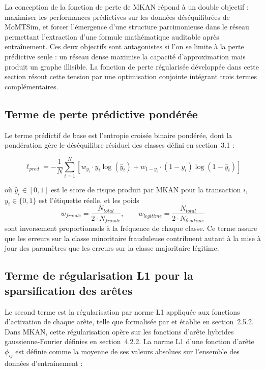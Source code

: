 \documentclass[11pt,a4paper,oneside]{report}
\theoremstyle{definition}
\theoremstyle{remark}
\begin{document}
La conception de la fonction de perte de MKAN répond à un double objectif : maximiser les performances prédictives sur les données déséquilibrées de MoMTSim, et forcer l'émergence d'une structure parcimonieuse dans le réseau permettant l'extraction d'une formule mathématique auditable après entraînement. Ces deux objectifs sont antagonistes si l'on se limite à la perte prédictive seule : un réseau dense maximise la capacité d'approximation mais produit un graphe illisible. La fonction de perte régularisée développée dans cette section résout cette tension par une optimisation conjointe intégrant trois termes complémentaires.

\subsection{Terme de perte prédictive pondérée}
\label{subsubsec:perte-predictive}

Le terme prédictif de base est l'entropie croisée binaire pondérée, dont la pondération gère le déséquilibre résiduel des classes défini en section~3.1 :

\begin{equation}
\ell_{pred} = -\frac{1}{N}\sum_{i=1}^{N}\left[w_{y_i} \cdot y_i \log(\hat{y}_i) + w_{1-y_i} \cdot (1-y_i)\log(1-\hat{y}_i)\right]
\label{eq:perte-predictive}
\end{equation}

où $\hat{y}_i \in [0,1]$ est le score de risque produit par MKAN pour la transaction $i$, $y_i \in \{0,1\}$ est l'étiquette réelle, et les poids
\[
w_{fraude} = \frac{N_{total}}{2 \cdot N_{fraude}}, \qquad w_{l\acute{e}gitime} = \frac{N_{total}}{2 \cdot N_{l\acute{e}gitime}}
\]
sont inversement proportionnels à la fréquence de chaque classe. Ce terme assure que les erreurs sur la classe minoritaire frauduleuse contribuent autant à la mise à jour des paramètres que les erreurs sur la classe majoritaire légitime.

\subsection{Terme de régularisation L1 pour la sparsification des arêtes}
\label{subsubsec:regularisation-l1}

Le second terme est la régularisation par norme L1 appliquée aux fonctions d'activation de chaque arête, telle que formalisée par \citet{liu2024kan} et établie en section~2.5.2. Dans MKAN, cette régularisation opère sur les fonctions d'arête hybrides gaussienne-Fourier définies en section~4.2.2. La norme L1 d'une fonction d'arête $\phi_{ij}$ est définie comme la moyenne de ses valeurs absolues sur l'ensemble des données d'entraînement :
\end{document}
